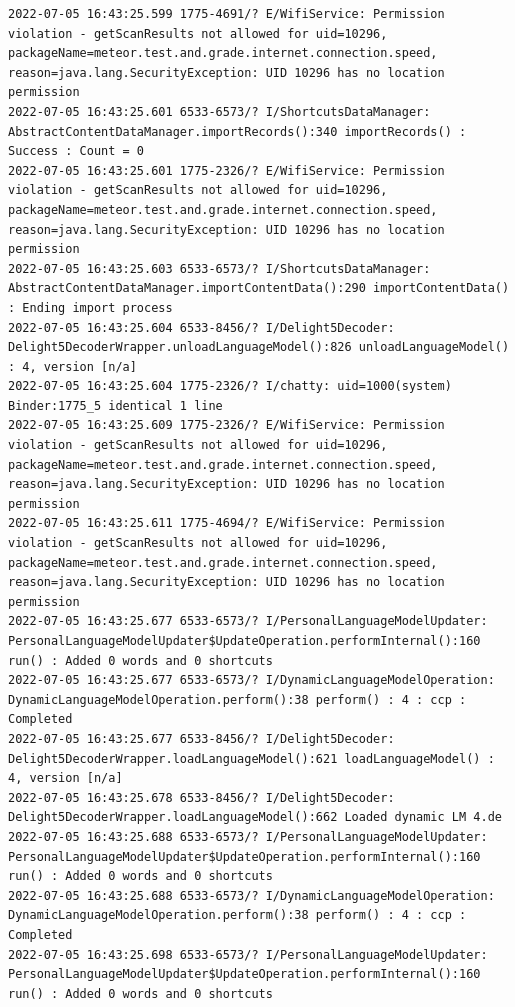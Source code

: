 \documentclass[a4paper,12pt]{book}
\begin{document}
\begin{lstlisting}
2022-07-05 16:43:25.599 1775-4691/? E/WifiService: Permission violation - getScanResults not allowed for uid=10296, packageName=meteor.test.and.grade.internet.connection.speed, reason=java.lang.SecurityException: UID 10296 has no location permission
2022-07-05 16:43:25.601 6533-6573/? I/ShortcutsDataManager: AbstractContentDataManager.importRecords():340 importRecords() : Success : Count = 0
2022-07-05 16:43:25.601 1775-2326/? E/WifiService: Permission violation - getScanResults not allowed for uid=10296, packageName=meteor.test.and.grade.internet.connection.speed, reason=java.lang.SecurityException: UID 10296 has no location permission
2022-07-05 16:43:25.603 6533-6573/? I/ShortcutsDataManager: AbstractContentDataManager.importContentData():290 importContentData() : Ending import process
2022-07-05 16:43:25.604 6533-8456/? I/Delight5Decoder: Delight5DecoderWrapper.unloadLanguageModel():826 unloadLanguageModel() : 4, version [n/a]
2022-07-05 16:43:25.604 1775-2326/? I/chatty: uid=1000(system) Binder:1775_5 identical 1 line
2022-07-05 16:43:25.609 1775-2326/? E/WifiService: Permission violation - getScanResults not allowed for uid=10296, packageName=meteor.test.and.grade.internet.connection.speed, reason=java.lang.SecurityException: UID 10296 has no location permission
2022-07-05 16:43:25.611 1775-4694/? E/WifiService: Permission violation - getScanResults not allowed for uid=10296, packageName=meteor.test.and.grade.internet.connection.speed, reason=java.lang.SecurityException: UID 10296 has no location permission
2022-07-05 16:43:25.677 6533-6573/? I/PersonalLanguageModelUpdater: PersonalLanguageModelUpdater$UpdateOperation.performInternal():160 run() : Added 0 words and 0 shortcuts
2022-07-05 16:43:25.677 6533-6573/? I/DynamicLanguageModelOperation: DynamicLanguageModelOperation.perform():38 perform() : 4 : ccp : Completed
2022-07-05 16:43:25.677 6533-8456/? I/Delight5Decoder: Delight5DecoderWrapper.loadLanguageModel():621 loadLanguageModel() : 4, version [n/a]
2022-07-05 16:43:25.678 6533-8456/? I/Delight5Decoder: Delight5DecoderWrapper.loadLanguageModel():662 Loaded dynamic LM 4.de
2022-07-05 16:43:25.688 6533-6573/? I/PersonalLanguageModelUpdater: PersonalLanguageModelUpdater$UpdateOperation.performInternal():160 run() : Added 0 words and 0 shortcuts
2022-07-05 16:43:25.688 6533-6573/? I/DynamicLanguageModelOperation: DynamicLanguageModelOperation.perform():38 perform() : 4 : ccp : Completed
2022-07-05 16:43:25.698 6533-6573/? I/PersonalLanguageModelUpdater: PersonalLanguageModelUpdater$UpdateOperation.performInternal():160 run() : Added 0 words and 0 shortcuts

\end{lstlisting}
\end{document}
